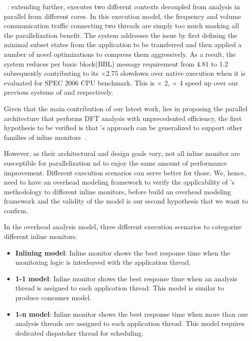 {\bf \sreplica}~\cite{sreplica:ccs2013}: extending \tfa further, \sreplica
executes two different contexts decoupled from \tfa analysis in parallel from
different cores. In this execution model, the frequency and volume
communication traffic connecting two threads are simply too much masking all
the parallelization benefit. The system addresses the issue by first defining
the minimal subset states from the application to be transferred and then
applied a number of novel optimizations to compress them aggressively. As a
result, the system reduces per basic block(BBL) message requirement from 4.81
to 1.2 subsequently contributing to its $\times 2.75$ slowdown over native
execution when it is evaluated for SPEC 2006 CPU benchmark. This is $\times$ 2,  
$\times$ 4 speed up over our previous systems of \libdft and \tfa respectively.

%
%
Given that the main  contribution of our latest work, \sreplica lies in
proposing the parallel architecture that performs DFT analysis with
unprecedented efficiency, the first hypothesis to be verified is that
\sreplica's approach can be generalized to support other families of inline
monitors~\cite{cab:oopsala2009}. 

However, as their architectural and design goals vary, not all inline monitor
are susceptible for parallelization nd \sreplica to enjoy the same amount of
performance improvement. Different execution scenarios can serve better for
those. We, hence, need to have an overhead modeling framework to verify the
applicability of \sreplica's methodology to different inline monitors, before 
build an overhead modeling framework and the validity of the model is our
second hypothesis that we want to confirm.

In the overhead analysis model, three different execution scenarios to
categorize different inline monitors. 

\begin{itemize}

    \item {\bf Inlining model}: Inline monitor shows the best response time
            when the monitoring logic is interleaved with the application
            thread.

    \item {\bf 1-1 model}: Inline monitor shows the best response time when an
            analysis thread is assigned to each application thread. This model
            is similar to produce consumer model.

    \item {\bf 1-n model}: Inline monitor shows the best response time when
            more than one analysis threads are assigned to each application
            thread.  This model requires dedicated dispatcher thread for
            scheduling.
    \end{itemize}

